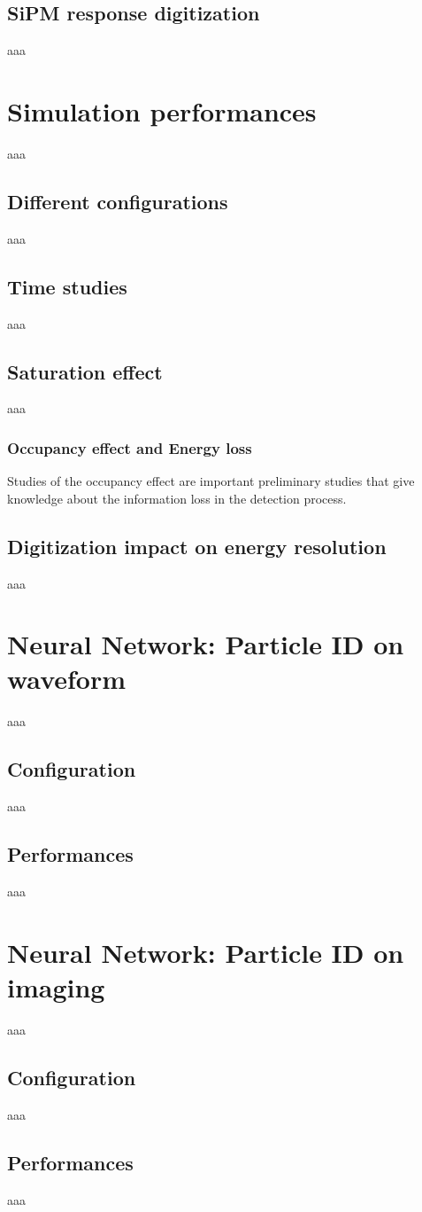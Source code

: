 \subsection{SiPM response digitization} \label{subsec:Sim_SiPM}
aaa

\section{Simulation performances} \label{sec:Sim_perf}
aaa

\subsection{Different configurations} \label{subsec:SiPM_conf}
aaa

\subsection{Time studies} \label{subsec:Time}
aaa

\subsection{Saturation effect} \label{subsec:Sat_effect}
aaa

\subsubsection{Occupancy effect and Energy loss}
Studies of the occupancy effect are important preliminary studies that give knowledge about the information loss in the detection process.\\

\subsection{Digitization impact on energy resolution} \label{subsec:E_res}
aaa

\section{Neural Network: Particle ID on waveform} \label{sec:NN_waveform}
aaa

\subsection{Configuration}
aaa

\subsection{Performances}
aaa

\section{Neural Network: Particle ID on imaging} \label{sec:NN_img}
aaa

\subsection{Configuration}
aaa

\subsection{Performances}
aaa